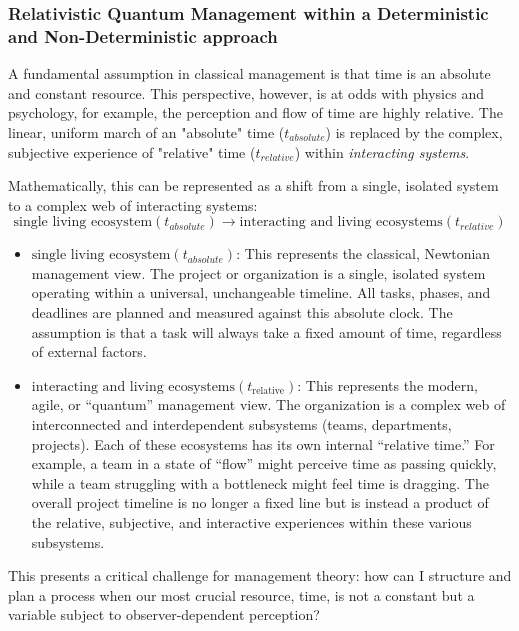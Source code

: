 \documentclass{article}
\begin{document}
\subsubsection*{Relativistic Quantum Management within a Deterministic and Non-Deterministic approach}
\label{RQM}
A fundamental assumption in classical management is that time is an absolute and constant resource. This perspective, however, is at odds with physics and psychology, for example, the perception and flow of time are highly relative. The linear, uniform march of an "absolute" time ($t_{absolute}$) is replaced by the complex, subjective experience of "relative" time ($t_{relative}$) within \textit{interacting systems}.
 
 Mathematically, this can be represented as a shift from a single, isolated system to a complex web of interacting systems:
 $$ \text{single living ecosystem}(t_{absolute}) \rightarrow \text{interacting and living ecosystems}(t_{relative}) $$

\begin{itemize}
\item $\text{single living ecosystem}(t_{absolute})$: This represents the classical, Newtonian management view. The project or organization is a single, isolated system operating within a universal, unchangeable timeline. All tasks, phases, and deadlines are planned and measured against this absolute clock. The assumption is that a task will always take a fixed amount of time, regardless of external factors.

\item $\text{interacting and living ecosystems}(t_{\text{relative}})$: This represents the modern, agile, or ``quantum'' management view. The organization is a complex web of interconnected and interdependent subsystems (teams, departments, projects). Each of these ecosystems has its own internal ``relative time.'' For example, a team in a state of ``flow'' might perceive time as passing quickly, while a team struggling with a bottleneck might feel time is dragging. The overall project timeline is no longer a fixed line but is instead a product of the relative, subjective, and interactive experiences within these various subsystems.

\end{itemize}
 
 This presents a critical challenge for management theory: how can I structure and plan a process when our most crucial resource, time, is not a constant but a variable subject to observer-dependent perception?
 
\end{document}
